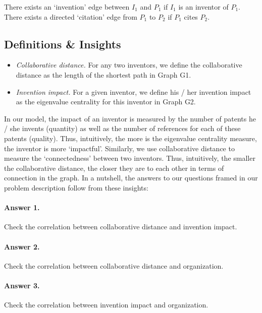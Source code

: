 There exists an `invention' edge between $I_1$ and $P_1$ if $I_1$ is an inventor of $P_1$.
There exists a directed `citation' edge from $P_1$ to $P_2$ if $P_1$ cites $P_2$.

\subsection{Definitions \& Insights}

	\begin{itemize}
		\item {\em Collaborative distance.} For any two inventors, we define
		the collaborative distance as the length of the shortest path in
		Graph G1.

		\item {\em Invention impact.} For a given inventor, we define his /
		her invention impact as the eigenvalue centrality for this inventor
		in Graph G2.
	\end{itemize}


In our model, the impact of an inventor is measured by the number of patents
he / she invents (quantity) as well as the number of references for each of
these patents (quality). Thus, intuitively, the more is the eigenvalue
centrality measure, the inventor is more `impactful'. Similarly, we use
collaborative distance to measure the `connectedness' between two inventors.
Thus, intuitively, the smaller the collaborative distance, the closer they are
to each other in terms of connection in the graph.  In a nutshell, the answers
to our questions framed in our problem description follow from these insights:

\paragraph{Answer 1.} Check the correlation between collaborative distance and invention impact. 

\paragraph{Answer 2.} Check the correlation between collaborative distance and organization.

\paragraph{Answer 3.} Check the correlation between invention impact and organization.
